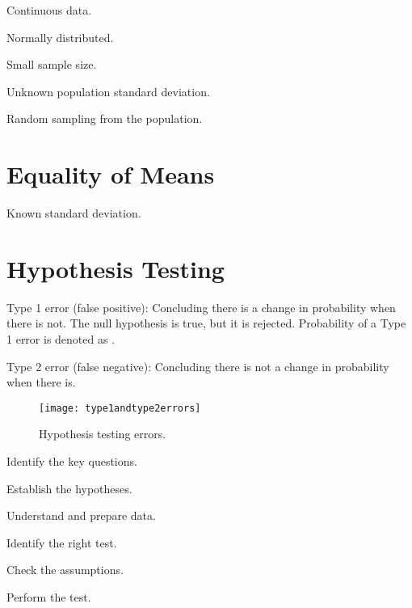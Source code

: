 	\begin{bulletedlist}
		\item Continuous data.
		\item Normally distributed.
		\item Small sample size.
		\item Unknown population standard deviation.
		\item Random sampling from the population.
	\end{bulletedlist}

	\section{Equality of Means}
Known standard deviation.

	\section{Hypothesis Testing}
Type 1 error (false positive): Concluding there is a change in probability when there is not.  The null hypothesis is true, but it is rejected.  Probability of a Type 1 error is denoted as \levelofsignificance{}.

Type 2 error (false negative): Concluding there is not a change in probability when there is.

	\begin{figure}[tbp]
		\centering
		\texttt{[image: type1andtype2errors]}
		\caption{Hypothesis testing errors.}
		\label{fig:type1andtype2errors}
	\end{figure}

	\begin{numberedlist}
		\item Identify the key questions.
		\item Establish the hypotheses.
		\item Understand and prepare data.
		\item Identify the right test.
		\item Check the assumptions.
		\item Perform the test.
	\end{numberedlist} 
